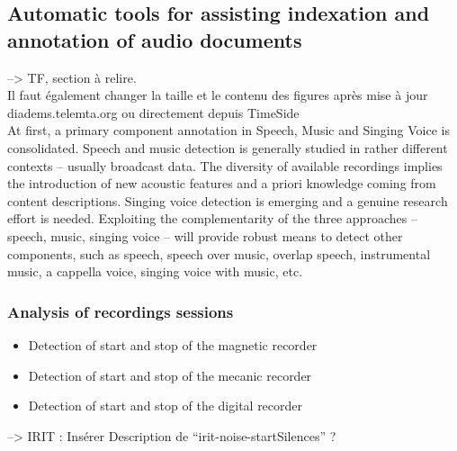 \documentclass{sig-alternate}
\begin{document}
\subsection{Automatic tools for assisting indexation and annotation of audio documents}
{\color{red} --> TF, section à relire.\\
 Il faut également changer la taille et le contenu des figures après mise à jour diadems.telemta.org ou directement depuis TimeSide}\\
At first, a primary component annotation in Speech, Music and Singing Voice is consolidated. Speech and music detection is generally studied in rather different contexts – usually broadcast data. The diversity of available recordings implies the introduction of new acoustic features and a priori knowledge coming from content descriptions. Singing voice detection is emerging and a genuine research effort is needed. Exploiting the complementarity of the three approaches – speech, music, singing voice – will provide robust means to detect other components, such as speech, speech over music, overlap speech, instrumental music, a cappella voice, singing voice with music, etc. 

\subsubsection{Analysis of recordings sessions}
\begin{itemize}
\item Detection of start and stop of the magnetic recorder
\item Detection of start and stop of the mecanic recorder
\item Detection of start and stop of the digital recorder
\end{itemize}
{\color{red}  --> IRIT : Insérer Description de ``irit-noise-startSilences'' ?}
\end{document}

